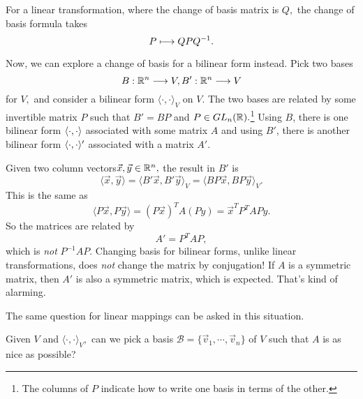 For a linear transformation, where the change of basis matrix is $Q,$ the change of basis formula takes \[P \longmapsto QPQ^{-1}.\]

Now, we can explore a change of basis for a bilinear form instead. Pick two bases \[B: \mathbb R^n \longrightarrow V, B': \mathbb R^n \longrightarrow V\] for $V,$ and consider a bilinear form $\langle \cdot, \cdot \rangle_V$ on $V.$ The two bases are related by some invertible matrix $P$ such that $B' = BP$ and $P \in GL_n(\mathbb R).$\footnote{The columns of $P$ indicate how to write one basis in terms of the other.} Using $B$, there is one bilinear form $\langle \cdot, \cdot \rangle$ associated with some matrix $A$ and using $B'$, there is another bilinear form $\langle \cdot, \cdot \rangle'$ associated with a matrix $A'.$

\begin{center}

\end{center}




Given two column vectors$ \vec{x}, \vec{y} \in \mathbb R^n,$ the result in $B'$ is \[\langle \vec{x}, \vec{y} \rangle = \langle B'\vec{x}, B'\vec{y} \rangle_V = \langle BP\vec{x}, BP\vec{y} \rangle_V.\] This is the same as 
\[
\langle P\vec{x}, P\vec{y} \rangle = (P\vec{x})^T A (Py) = \vec{x}^TP^TAPy.
\]
So the matrices are related by \[\boxed{A' = P^TAP},\] which is \emph{not} $P^{-1}AP.$ Changing basis for bilinear forms, unlike linear transformations, does \emph{not} change the matrix by conjugation! If $A$ is a symmetric matrix, then $A'$ is also a symmetric matrix, which is expected. That's kind of alarming.

The same question for linear mappings can be asked in this situation.
\begin{qq}
Given $V$ and $\langle \cdot, \cdot \rangle_V,$ can we pick a basis $\mathcal{B} = \{\vec{v}_1, \cdots, \vec{v}_n\}$ of $V$ such that $A$ is as nice as possible?
\end{qq}


